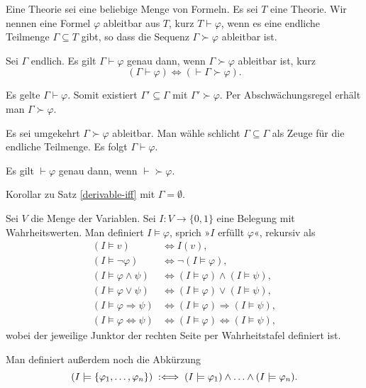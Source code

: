 \begin{Definition}\newlinefirst
Eine Theorie sei eine beliebige Menge von Formeln.
Es sei $T$ eine Theorie. Wir nennen eine Formel $\varphi$ ableitbar aus
$T$, kurz $T\vdash\varphi$, wenn es eine endliche Teilmenge
$\Gamma\subseteq T$ gibt, so dass die Sequenz $\Gamma\succ\varphi$
ableitbar ist.
\end{Definition}
\begin{Satz}\label{derivable-iff}
Sei $\Gamma$ endlich. Es gilt $\Gamma\vdash\varphi$ genau dann,
wenn $\Gamma\succ\varphi$ ableitbar ist, kurz
\[(\Gamma\vdash\varphi) \iff (\vdash \Gamma\succ\varphi).\]
\end{Satz}
\begin{Beweis}
Es gelte $\Gamma\vdash\varphi$. Somit existiert
$\Gamma'\subseteq\Gamma$ mit $\Gamma'\succ\varphi$.
Per Abschwächungsregel erhält man $\Gamma\succ\varphi$.

Es sei umgekehrt $\Gamma\succ\varphi$ ableitbar. Man wähle schlicht
$\Gamma\subseteq\Gamma$ als Zeuge für die endliche Teilmenge.
Es folgt $\Gamma\vdash\varphi$.\,\qedsymbol
\end{Beweis}
\begin{Satz}
Es gilt $\vdash\varphi$ genau dann, wenn $\vdash\succ\varphi$.
\end{Satz}
\begin{Beweis}
Korollar zu Satz \ref{derivable-iff} mit $\Gamma=\emptyset$.
\end{Beweis}

\begin{Definition}\label{def:sat}\newlinefirst
Sei $V$ die Menge der Variablen. Sei $I\colon V\to\{0,1\}$ eine
Belegung mit Wahrheitswerten. Man definiert $I\models\varphi$,
sprich »$I$ erfüllt $\varphi$«, rekursiv als
\begin{align*}
(I\models v) &\iff I(v),\\
(I\models\neg\varphi) &\iff \neg (I\models\varphi),\\
(I\models \varphi\land\psi) &\iff (I\models\varphi)\land (I\models\psi),\\
(I\models \varphi\lor\psi) &\iff (I\models\varphi)\lor (I\models\psi),\\
(I\models \varphi\Rightarrow\psi) &\iff (I\models\varphi)\Rightarrow (I\models\psi),\\
(I\models \varphi\Leftrightarrow\psi) &\iff (I\models\varphi)\Leftrightarrow (I\models\psi),
\end{align*}
wobei der jeweilige Junktor der rechten Seite per Wahrheitstafel
definiert ist.
\end{Definition}
\begin{Definition}\label{def:sat-context}
Man definiert außerdem noch die Abkürzung
\[(I\models\{\varphi_1,\ldots,\varphi_n\})
\;:\Longleftrightarrow\; (I\models\varphi_1)\land\ldots\land (I\models\varphi_n).\]
\end{Definition}

